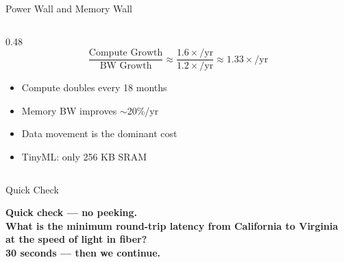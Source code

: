 \documentclass[aspectratio=169, 12pt]{beamer}
\begin{document}
\begin{frame}{Power Wall and Memory Wall}
\begin{columns}[T]
\begin{column}{0.48\textwidth}
    \vspace{0.1cm}
    $$\frac{\text{Compute Growth}}{\text{BW Growth}} \approx \frac{1.6\times\text{/yr}}{1.2\times\text{/yr}} \approx 1.33\times\text{/yr}$$

    \vspace{0.1cm}
    \begin{itemize}\setlength\itemsep{1pt}
      \item Compute doubles every 18 months
      \item Memory BW improves $\sim$20\%/yr
      \item Data movement is the dominant cost
      \item TinyML: only 256 KB SRAM
    \end{itemize}

    \vspace{0.05cm}
  \end{column}
\end{columns}

\end{frame}

\begin{frame}{Quick Check}
\note{
%
%
}

\centering
\Large\bfseries Quick check --- no peeking.\\[0.5cm]
\normalsize What is the minimum round-trip latency from California to Virginia at the speed of light in fiber?\\[0.3cm]
{\small 30 seconds --- then we continue.}
\end{frame}
\end{document}
